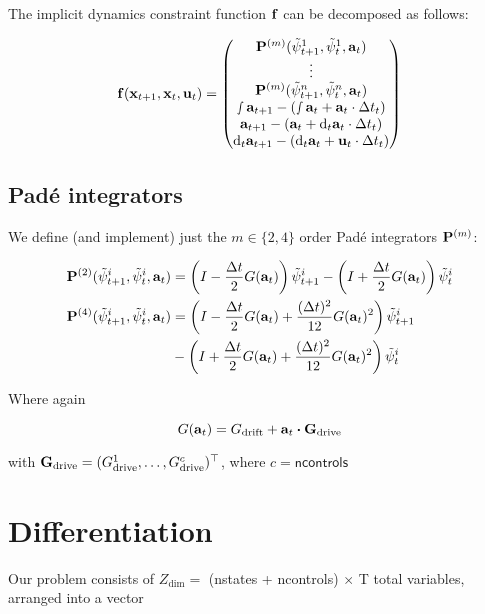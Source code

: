 \documentclass{article}
\newcommand{\isopsi}{\tilde \psi}
\begin{document}
The implicit dynamics constraint function $\vb{f}$ can be decomposed as follows:

$$
\vb{f}(\vb{x}_{t+1}, \vb{x}_t, \vb{u}_t) 
= \begin{pmatrix} 
  \vb{P}^{(m)} (\isopsi^1_{t+1}, \isopsi^1_t, \vb{a}_t) \\ 
  \vdots \\
  \vb{P}^{(m)} (\isopsi^n_{t+1}, \isopsi^n_t, \vb{a}_t) \\
  \smallint \vb{a}_{t+1} - \left(\smallint \vb{a}_t + \vb{a}_t \cdot \Delta t_t  \right) \\
  \vb{a}_{t+1} - \left(\vb{a}_t + \dd_t \vb{a}_t \cdot \Delta t_t  \right) \\
  \dd_t \vb{a}_{t+1} - \left(\dd_t \vb{a}_t + \vb{u}_t \cdot \Delta t_t \right)
  \end{pmatrix}
$$

\newpage
\subsection{Pad\'e integrators}

We define (and implement) just the $m \in \{2, 4\}$ order Pad\'e integrators $\vb{P}^{(m)}$:

\begin{align*}
  \vb{P}^{(2)}(\isopsi^i_{t+1}, \isopsi^i_t, \vb{a}_t) &= \left(I - \frac{\Delta t}{2} G(\vb{a}_t) \right) \isopsi^i_{t+1} -  \left(I + \frac{\Delta t}{2} G(\vb{a}_t) \right) \isopsi^i_{t}\\   
  \vb{P}^{(4)}(\isopsi^i_{t+1}, \isopsi^i_t, \vb{a}_t) &= \left(I - \frac{\Delta t}{2} G(\vb{a}_t) + \frac{(\Delta t)^2}{12} G(\vb{a}_t)^2\right) \isopsi^i_{t+1} \\ 
  &- \left(I + \frac{\Delta t}{2} G(\vb{a}_t) + \frac{(\Delta t)^2}{12} G(\vb{a}_t)^2\right) \isopsi^i_t 
\end{align*}

Where again 

$$
G(\vb{a}_t) = G_{\text{drift}} + \vb{a}_t \vdot \vb{G}_{\text{drive}}
$$

with $\vb{G}_{\text{drive}} = (G^1_{\text{drive}}, \dots, G^c_{\text{drive}})^\top$, where $c = \textsf{ncontrols}$

\newpage
\section{Differentiation}

Our problem consists of $Z_{\dim}=$ \textsf{(nstates + ncontrols) $\times$ T} total variables, arranged into a vector
\end{document}
